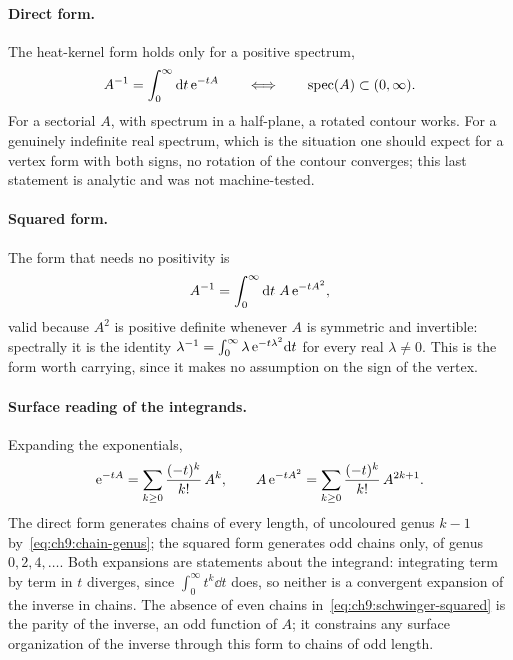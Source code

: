 \paragraph{Direct form.}
The heat-kernel form holds only for a positive spectrum,
\begin{equation}
  \label{eq:ch9:schwinger-direct}
  A^{-1}
    = \int_0^\infty \mathrm{d} t \, \mathrm{e}^{- t A}
  \qquad \Longleftrightarrow \qquad
  \operatorname{spec}(A)
    \subset (0, \infty).
\end{equation}
For a sectorial $A$, with spectrum in a half-plane, a rotated contour works.
For a genuinely indefinite real spectrum, which is the situation one should expect for a vertex form with both signs, no rotation of the contour converges; this last statement is analytic and was not machine-tested.

\paragraph{Squared form.}
The form that needs no positivity is
\begin{equation}
  \label{eq:ch9:schwinger-squared}
  A^{-1}
    = \int_0^\infty \mathrm{d} t \; A \, \mathrm{e}^{- t A^2},
\end{equation}
valid because $A^2$ is positive definite whenever $A$ is symmetric and invertible: spectrally it is the identity $\lambda^{-1} = \int_0^\infty \lambda \, \mathrm{e}^{- t \lambda^2} \mathrm{d} t$ for every real $\lambda \neq 0$.
This is the form worth carrying, since it makes no assumption on the sign of the vertex.

\paragraph{Surface reading of the integrands.}
Expanding the exponentials,
\begin{equation}
  \label{eq:ch9:schwinger-chains}
  \mathrm{e}^{- t A}
    = \sum_{k \ge 0} \frac{(- t)^k}{k!} \, A^k,
  \qquad
  A \, \mathrm{e}^{- t A^2}
    = \sum_{k \ge 0} \frac{(- t)^k}{k!} \, A^{2 k + 1}.
\end{equation}
The direct form generates chains of every length, of uncoloured genus $k - 1$ by~\eqref{eq:ch9:chain-genus}; the squared form generates odd chains only, of genus $0, 2, 4, \ldots$.
Both expansions are statements about the integrand: integrating term by term in $t$ diverges, since $\int_0^\infty t^k \dd t$ does, so neither is a convergent expansion of the inverse in chains.
The absence of even chains in~\eqref{eq:ch9:schwinger-squared} is the parity of the inverse, an odd function of $A$; it constrains any surface organization of the inverse through this form to chains of odd length.

